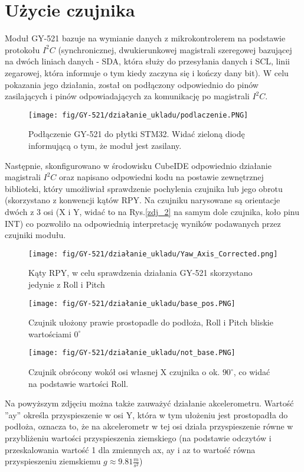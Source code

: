 \documentclass[11pt, a4paper]{article}
\begin{document}
\section{Użycie czujnika}
Moduł GY-521 bazuje na wymianie danych z mikrokontrolerem na podstawie protokołu $I^2C$ (synchronicznej, dwukierunkowej magistrali szeregowej bazującej na dwóch liniach danych - SDA, która służy do przesyłania danych i SCL, linii zegarowej, która informuje o tym kiedy zaczyna się i kończy dany bit). W celu pokazania jego działania, został on podłączony odpowiednio do pinów zasilających i pinów odpowiadających za komunikację po magistrali $I^2C$.
\vspace{0.3cm}
\begin{figure}[H]
\centering
\texttt{[image: fig/GY-521/działanie\_ukladu/podlaczenie.PNG]}
\caption{Podłączenie GY-521 do płytki STM32. Widać zieloną diodę informującą o tym, że moduł jest zasilany.}
\label{fig:sub3}
\end{figure}
\vspace{0.3cm}
Następnie, skonfigurowano w środowisku CubeIDE odpowiednio działanie magistrali $I^2C$ oraz napisano odpowiedni kodu na postawie zewnętrznej biblioteki, który umożliwiał sprawdzenie pochylenia czujnika lub jego obrotu (skorzystano z konwencji kątów RPY. Na czujniku narysowane są orientacje dwóch z 3 osi (X i Y, widać to na Rys.\ref{zdj_2} na samym dole czujnika, koło pinu INT) co pozwoliło na odpowiednią interpretację wyników podawanych przez czujniki modułu.
\vspace{0.3cm}
\begin{figure}[H]
\centering
\texttt{[image: fig/GY-521/działanie\_ukladu/Yaw\_Axis\_Corrected.png]}
\caption{Kąty RPY, w celu sprawdzenia działania GY-521 skorzystano jedynie z Roll i Pitch}
\label{fig:sub3}
\end{figure}
\vspace{0.3cm}
\vspace{0.3cm}
\begin{figure}[H]
\centering
\texttt{[image: fig/GY-521/działanie\_ukladu/base\_pos.PNG]}
\caption{Czujnik ułożony prawie prostopadle do podłoża, Roll i Pitch bliskie wartościami $0^\circ$}
\label{fig:sub3}
\end{figure}
\vspace{0.3cm}
\vspace{0.3cm}
\begin{figure}[H]
\centering
\texttt{[image: fig/GY-521/działanie\_ukladu/not\_base.PNG]}
\caption{Czujnik obrócony wokół osi własnej X czujnika o ok. $90^\circ$, co widać na podstawie wartości Roll.}
\label{fig:sub3}
\end{figure}
\vspace{0.3cm}
Na powyższym zdjęciu można także zauważyć działanie akcelerometru. Wartość ''ay'' określa przyspieszenie w osi Y, która w tym ułożeniu jest prostopadła do podłoża, oznacza to, że na akcelerometr w tej osi działa przyspieszenie równe w przybliżeniu wartości przyspieszenia ziemskiego (na podstawie odczytów i przeskalowania wartość 1 dla zmiennych ax, ay i az to wartość równa przyspieszeniu ziemskiemu $g\approx9.81\frac{m}{s^2}$)


\printbibliography[heading=bibintoc]
\end{document}
